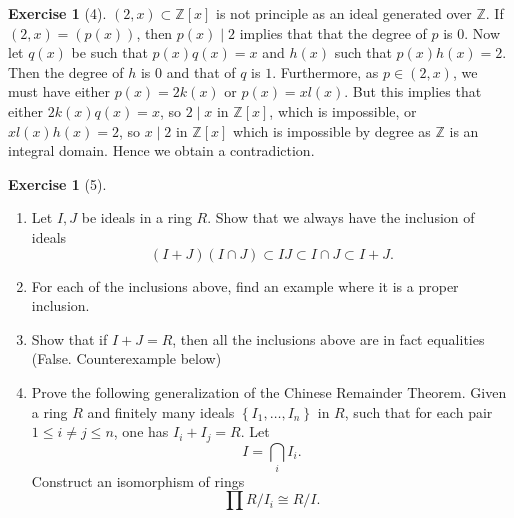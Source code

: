\documentclass[reqno]{amsart}
\theoremstyle{definition}
\newtheorem{exercise}[theorem]{Exercise}
\theoremstyle{remark}
\begin{document}
\begin{exercise}[4]
    $\left( 2,x \right) \subset \mathbb{Z}[x]$ is not principle
    as an ideal generated over $\mathbb{Z}$.
    If $\left( 2,x \right) = \left( p(x) \right) $, then
    $p(x)  \mid 2$ implies that that the
    degree of $p$ is $0$. Now
    let $q(x)$ be such that
    $p(x)q(x) = x$ and
     $h(x)$ such that $p(x) h(x) = 2$. Then
     the degree of $h$ is $0$ and that of $q$ is $1$.
     Furthermore, as $p \in \left( 2,x \right) $, we must
     have either $p(x) = 2 k(x)$ or
     $p(x) = x l(x)$. But this implies that either
     $2 k(x) q(x) = x$, so
     $2  \mid x$ in $\mathbb{Z}[x]$, which is
     impossible, or
     $x l(x)h(x) = 2$, so
     $x  \mid 2$ in $\mathbb{Z}\left[ x \right] $ which is
     impossible by degree as $\mathbb{Z}$ is an integral
     domain. Hence
    we obtain a contradiction.
\end{exercise}

\begin{exercise}[5]
    \begin{enumerate}
        \item Let $I,J$ be ideals in a ring
            $R$. Show that we always have the inclusion
            of ideals
            \[
                \left( I+ J \right) 
                \left( I \cap J \right) 
                \subset IJ \subset I \cap J\subset 
                I+J.
            \] 
        \item For each of the inclusions above, find an example
            where it is a proper inclusion.
        \item Show that if $I + J = R$, then all
            the inclusions above are in fact equalities
            (False. Counterexample below)
        \item Prove the following generalization of the
            Chinese Remainder Theorem. Given a ring
            $R$ and finitely many ideals
            $\left\{ I_1, \ldots, I_n \right\} $ in
            $R$, such that for each pair
            $1 \le i \neq j \le n$, one has
            $I_i + I_j = R$.
            Let
            \[
            I = \bigcap_{i} I_i .
            \] 
            Construct an isomorphism of rings
            \[
            \prod R/ I_i \cong R / I.
            \] 
    \end{enumerate}
\end{exercise}
\end{document}
